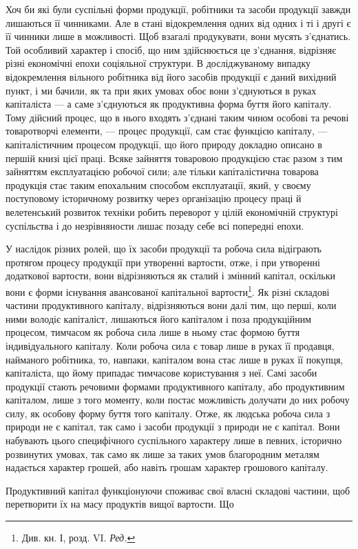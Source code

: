 
\label{original-13}
Хоч би які були суспільні форми продукції, робітники та засоби продукції
завжди лишаються її чинниками. Але в стані відокремлення одних
від одних і ті і другі є її чинники лише в можливості. Щоб взагалі
продукувати, вони мусять з’єднатись. Той особливий характер і спосіб,
що ним здійснюється це з’єднання, відрізняє різні економічні епохи соціяльної
структури. В досліджуваному випадку відокремлення вільного
робітника від його засобів продукції є даний вихідний пункт, і ми
бачили, як та при яких умовах обоє вони з’єднуються в руках капіталіста —
а саме з’єднуються як продуктивна форма буття його капіталу. Тому
дійсний процес, що в нього входять з’єднані таким чином особові та
речові товаротворчі елементи, — процес продукції, сам стає функцією капіталу,
— капіталістичним процесом продукції, що його природу докладно
описано в першій книзі цієї праці. Всяке зайняття товаровою продукцією
стає разом з тим зайняттям експлуатацією робочої сили; але тільки капіталістична
товарова продукція стає таким епохальним способом експлуатації,
який, у своєму поступовому історичному розвитку через організацію
процесу праці й велетенський розвиток техніки робить переворот
у цілій економічній структурі суспільства і до незрівняности лишає позаду
себе всі попередні епохи.

У наслідок різних ролей, що їх засоби продукції та робоча сила відіграють
протягом процесу продукції при утворенні вартости, отже, і
при утворенні додаткової вартости, вони відрізняються як сталий і
змінний капітал, оскільки вони є форми існування авансованої капітальної
вартости\footnote*{
Див. кн. І, розд. VI. \emph{Ред.}
}. Як різні складові частини продуктивного капіталу, відрізняються
вони далі тим, що перші, коли ними володіє капіталіст, лишаються
його капіталом і поза продукційним процесом, тимчасом як робоча сила
лише в ньому стає формою буття індивідуального капіталу. Коли робоча
сила є товар лише в руках її продавця, найманого робітника, то, навпаки,
капіталом вона стає лише в руках її покупця, капіталіста, що
йому припадає тимчасове користування з неї. Самі засоби продукції
стають речовими формами продуктивного капіталу, або продуктивним
капіталом, лише з того моменту, коли постає можливість долучати до
них робочу силу, як особову форму буття того капіталу. Отже,
як людська робоча сила з природи не є капітал, так само і засоби
продукції з природи не є капітал. Вони набувають цього специфічного
суспільного характеру лише в певних, історично розвинутих умовах,
так само як лише за таких умов благородним металям надається характер
грошей, або навіть грошам характер грошового капіталу.

Продуктивний капітал функціонуючи споживає свої власні складові
частини, щоб перетворити їх на масу продуктів вищої вартости. Що
\parbreak{}  %

